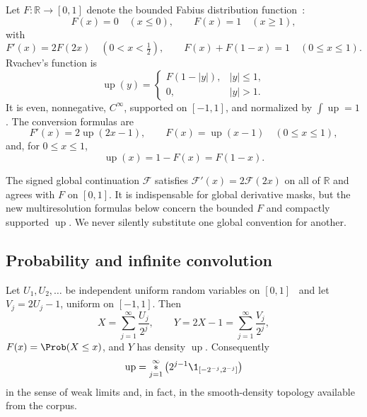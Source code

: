 \documentclass[11pt,oneside]{article}
\theoremstyle{definition}
\newcommand{\R}{\mathbb R}
\newcommand{\Up}{\operatorname{up}}
\begin{document}
Let $F:\R\to[0,1]$ denote the bounded Fabius distribution function~\cite{p5:fabius1966,p5:arias1982,p5:arias2018}:
\begin{equation}
 F(x)=0\quad(x\le0),\qquad
 F(x)=1\quad(x\ge1),                                      \label{p5:eq:F-boundary}
\end{equation}
with
\begin{equation}
 F'(x)=2F(2x)\quad(0<x<\tfrac12),
 \qquad F(x)+F(1-x)=1\quad(0\le x\le1).                  \label{p5:eq:F-basic}
\end{equation}
Rvachev's function is~\cite{p5:rvachev1971}
\begin{equation}
 \Up(y)=
 \begin{cases}
   F(1-|y|),& |y|\le1,\\
   0,& |y|>1.
 \end{cases}                                             \label{p5:eq:up-definition}
\end{equation}
It is even, nonnegative, $C^\infty$, supported on $[-1,1]$, and normalized by
$\int\Up=1$.  The conversion formulas are
\begin{equation}
 F'(x)=2\Up(2x-1),\qquad
 F(x)=\Up(x-1)\quad(0\le x\le1),                         \label{p5:eq:F-up-conversion}
\end{equation}
and, for $0\le x\le1$,
\begin{equation}
 \Up(x)=1-F(x)=F(1-x).                                   \label{p5:eq:up-survival}
\end{equation}

The signed global continuation $\mathcal F$ satisfies
$\mathcal F'(x)=2\mathcal F(2x)$ on all of $\R$ and agrees with $F$ on
$[0,1]$.  It is indispensable for global derivative masks, but the new
multiresolution formulas below concern the bounded $F$ and compactly supported
$\Up$.  We never silently substitute one global convention for another.

\subsection{Probability and infinite convolution}

\baseline Let $U_1,U_2,\ldots$ be independent uniform random variables on
$[0,1]$~\cite{p5:jessen1935} and let $V_j=2U_j-1$, uniform on $[-1,1]$.  Then
\begin{equation}
 X=\sum_{j=1}^\infty\frac{U_j}{2^j},
 \qquad
 Y=2X-1=\sum_{j=1}^\infty\frac{V_j}{2^j},                \label{p5:eq:random-series}
\end{equation}
$F(x)=\Prob(X\le x)$, and $Y$ has density $\Up$.  Consequently
\begin{equation}
 \Up=\mathop{\ast}_{j=1}^{\infty}
 \left(2^{j-1}\1_{[-2^{-j},2^{-j}]}
 \right)              \label{p5:eq:infinite-convolution}
\end{equation}
in the sense of weak limits and, in fact, in the smooth-density topology
available from the corpus.
\end{document}
